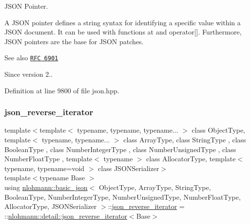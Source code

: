 J\+S\+ON Pointer. 

A J\+S\+ON pointer defines a string syntax for identifying a specific value within a J\+S\+ON document. It can be used with functions {\ttfamily at} and {\ttfamily operator\mbox{[}\mbox{]}}. Furthermore, J\+S\+ON pointers are the base for J\+S\+ON patches.

\begin{DoxySeeAlso}{See also}
\href{https://tools.ietf.org/html/rfc6901}{\tt R\+FC 6901}
\end{DoxySeeAlso}
\begin{DoxySince}{Since}
version 2.. 
\end{DoxySince}


Definition at line 9800 of file json.\+hpp.

\mbox{\label{classnlohmann_1_1basic__json_a8d18136ac63e52780e9d7441981a2db4}} 
\subsubsection{\texorpdfstring{json\+\_\+reverse\+\_\+iterator}{json\_reverse\_iterator}}
{\footnotesize\ttfamily template$<$template$<$ typename, typename, typename... $>$ class Object\+Type, template$<$ typename, typename... $>$ class Array\+Type, class String\+Type , class Boolean\+Type , class Number\+Integer\+Type , class Number\+Unsigned\+Type , class Number\+Float\+Type , template$<$ typename $>$ class Allocator\+Type, template$<$ typename, typename=void $>$ class J\+S\+O\+N\+Serializer$>$ \\
template$<$typename Base $>$ \\
using \hyperlink{classnlohmann_1_1basic__json}{nlohmann\+::basic\+\_\+json}$<$ Object\+Type, Array\+Type, String\+Type, Boolean\+Type, Number\+Integer\+Type, Number\+Unsigned\+Type, Number\+Float\+Type, Allocator\+Type, J\+S\+O\+N\+Serializer $>$\+::\hyperlink{classnlohmann_1_1basic__json_a8d18136ac63e52780e9d7441981a2db4}{json\+\_\+reverse\+\_\+iterator} =  \+::\hyperlink{classnlohmann_1_1detail_1_1json__reverse__iterator}{nlohmann\+::detail\+::json\+\_\+reverse\+\_\+iterator}$<$Base$>$\hspace{0.3cm}{\ttfamily [private]}}



